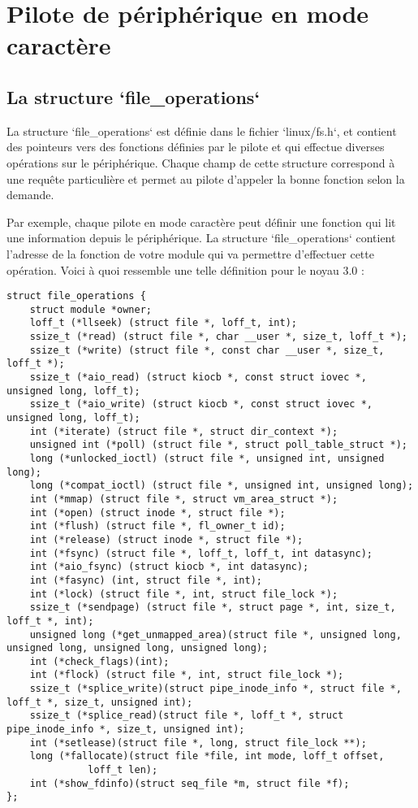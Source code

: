 \documentclass[11pt]{article}
\begin{document}
\section*{Pilote de périphérique en mode caractère}
\label{sec-6}

\subsection*{La structure `file\_operations`}
\label{sec-6-1}

La structure `file\_operations` est définie dans le fichier `linux/fs.h`, et contient des pointeurs vers des fonctions définies par le pilote et qui effectue diverses opérations sur le périphérique. Chaque champ de cette structure correspond à une requête particulière et permet au pilote d'appeler la bonne fonction selon la demande.

Par exemple, chaque pilote en mode caractère peut définir une fonction qui lit une information depuis le périphérique. La structure `file\_operations` contient l'adresse de la fonction de votre module qui va permettre d'effectuer cette opération. Voici à quoi ressemble une telle définition pour le noyau 3.0 :

\begin{verbatim}
struct file_operations {
    struct module *owner;
    loff_t (*llseek) (struct file *, loff_t, int);
    ssize_t (*read) (struct file *, char __user *, size_t, loff_t *);
    ssize_t (*write) (struct file *, const char __user *, size_t, loff_t *);
    ssize_t (*aio_read) (struct kiocb *, const struct iovec *, unsigned long, loff_t);
    ssize_t (*aio_write) (struct kiocb *, const struct iovec *, unsigned long, loff_t);
    int (*iterate) (struct file *, struct dir_context *);
    unsigned int (*poll) (struct file *, struct poll_table_struct *);
    long (*unlocked_ioctl) (struct file *, unsigned int, unsigned long);
    long (*compat_ioctl) (struct file *, unsigned int, unsigned long);
    int (*mmap) (struct file *, struct vm_area_struct *);
    int (*open) (struct inode *, struct file *);
    int (*flush) (struct file *, fl_owner_t id);
    int (*release) (struct inode *, struct file *);
    int (*fsync) (struct file *, loff_t, loff_t, int datasync);
    int (*aio_fsync) (struct kiocb *, int datasync);
    int (*fasync) (int, struct file *, int);
    int (*lock) (struct file *, int, struct file_lock *);
    ssize_t (*sendpage) (struct file *, struct page *, int, size_t, loff_t *, int);
    unsigned long (*get_unmapped_area)(struct file *, unsigned long, unsigned long, unsigned long, unsigned long);
    int (*check_flags)(int);
    int (*flock) (struct file *, int, struct file_lock *);
    ssize_t (*splice_write)(struct pipe_inode_info *, struct file *, loff_t *, size_t, unsigned int);
    ssize_t (*splice_read)(struct file *, loff_t *, struct pipe_inode_info *, size_t, unsigned int);
    int (*setlease)(struct file *, long, struct file_lock **);
    long (*fallocate)(struct file *file, int mode, loff_t offset,
              loff_t len);
    int (*show_fdinfo)(struct seq_file *m, struct file *f);
};
\end{verbatim}
\end{document}
